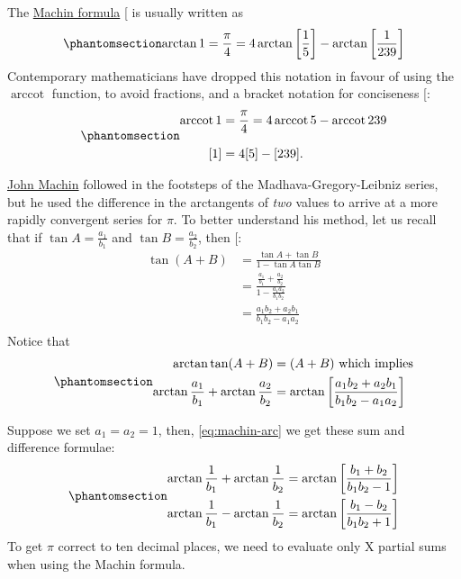 \documentclass[
  a4paper,
]{article}
\DeclareMathOperator{\arccot}{arccot}
\begin{document}
The \href{https://en.wikipedia.org/wiki/Machin-like_formula2}{Machin
formula} {[}\citeproc{ref-schwartz-2012}{22}{]} is usually written as
\begin{equation}\phantomsection\label{eq:machin-formula}{
\arctan{1} = \frac{\pi}{4} = 4\arctan\left[ \frac{1}{5} \right] - \arctan\left[ \frac{1}{239} \right]
}\end{equation} Contemporary mathematicians have dropped this notation
in favour of using the \(\arccot\) function, to avoid fractions, and a
bracket notation for conciseness {[}\citeproc{ref-lehmer-1938}{23}{]}:
\begin{equation}\phantomsection\label{eq:machin-formula-cot}{
\begin{aligned}
\arccot{1} &= \frac{\pi}{4} = 4\arccot{5} - \arccot{239}\\[0.75em]
[1] &= 4[5] - [239].
\end{aligned}
}\end{equation}

\href{https://en.wikipedia.org/wiki/John_Machin}{John Machin} followed
in the footsteps of the Madhava-Gregory-Leibniz series, but he used the
difference in the arctangents of \emph{two} values to arrive at a more
rapidly convergent series for \(\pi\). To better understand his method,
let us recall that if \(\tan A = \frac{a_1}{b_1}\) and
\(\tan B = \frac{a_2}{b_2}\), then
{[}\citeproc{ref-libre-inv-trig-deriv}{24}{]}: \[
\begin{aligned}
\tan(A + B) &= \frac{\tan A + \tan B}{1 - \tan A\tan B}\\
&= \frac{\frac{a_{1}}{b_{1}} + \frac{a_{2}}{b_{2}}}{1 - \frac{a_{1}a_{2}}{b_{1}b_{2}}}\\
&= \frac{a_{1}b_{2} + a_{2}b_{1}}{b_{1}b_{2} - a_{1}a_{2}}\\
\end{aligned}
\] Notice that \begin{equation}\phantomsection\label{eq:machin-arc}{
\begin{aligned}
\arctan\tan(A+B) &= (A + B) \mbox { which implies}\\
\arctan\frac{a_1}{b_1}  + \arctan\frac{a_2}{b_2} &= \arctan\left[\frac{a_{1}b_{2} + a_{2}b_{1}}{b_{1}b_{2} - a_{1}a_{2}}\right]\\
\end{aligned}
}\end{equation}

Suppose we set \(a_{1} = a_{2} = 1\), then, \cref{eq:machin-arc} we get
these sum and difference formulae:
\begin{equation}\phantomsection\label{eq:sum-diff-arct}{
\begin{aligned}
\arctan\frac{1}{b_1}  + \arctan\frac{1}{b_2} &= \arctan\left[\frac{b_{1} + b_{2}}
{b_{1}b_{2} - 1}\right]\\
\arctan\frac{1}{b_1}  - \arctan\frac{1}{b_2} &= \arctan\left[\frac{b_{1} - b_{2}}
{b_{1}b_{2} + 1}\right]
\end{aligned}
}\end{equation} To get \(\pi\) correct to ten decimal places, we need to
evaluate only X partial sums when using the Machin formula.
\end{document}
